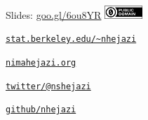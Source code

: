 \documentclass[12pt,t,handout]{beamer}
\begin{document}
\begin{frame}[c]{}

\Large
Slides: \href{https://goo.gl/6ou8YR}{goo.gl/6ou8YR} \quad
\includegraphics[height=5mm]{Figs/cc-zero.png}

\vspace{10mm}

\href{https://www.stat.berkeley.edu/~nhejazi}{\tt stat.berkeley.edu/\textasciitilde{}nhejazi}

\vspace{10mm}

\href{http://nimahejazi.org}{\tt nimahejazi.org}

\vspace{10mm}

\href{https://twitter.com/nshejazi}{\tt twitter/@nshejazi}

\vspace{10mm}

\href{https://github.com/nhejazi}{\tt github/nhejazi}


\end{frame}
\end{document}
